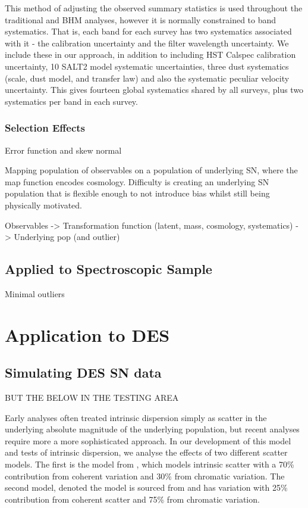 \documentclass[a4paper,fleqn,usenatbib]{mnras}
\newcommand{\green}{\color{green}}
\newcommand{\gten}{\citetalias{Guy2010}}
\newcommand{\celeven}{\citetalias{Chotard2011}}
\begin{document}
This method of adjusting the observed summary statistics is used throughout the traditional and BHM analyses, however it is normally constrained to band systematics. That is, each band for each survey has two systematics associated with it - the calibration uncertainty and the filter wavelength uncertainty. We include these in our approach, in addition to including HST Calspec calibration uncertainty, 10 SALT2 model systematic uncertainties, three dust systematics (scale, dust model, and transfer law) and also the systematic peculiar velocity uncertainty. This gives fourteen global systematics shared by all surveys, plus two systematics per band in each survey.

\subsubsection{Selection Effects}

Error function and skew normal




\vspace{20mm}
Mapping population of observables on a population of underlying SN, where the map function encodes
cosmology. Difficulty is creating an underlying SN population that is flexible enough to not introduce bias whilst still being physically motivated. 


Observables -> Transformation function (latent, mass, cosmology, systematics) -> Underlying pop (and outlier)

\subsection{Applied to Spectroscopic Sample}

Minimal outliers

\section{Application to DES}
\label{sec:des}

\subsection{Simulating DES SN data}
\label{sec:simdes}
{\green BUT THE BELOW IN THE TESTING AREA}

Early analyses often treated intrinsic dispersion simply as scatter in the underlying absolute magnitude of the underlying population, but recent analyses require more a more sophisticated approach. In our development of this model and tests of intrinsic dispersion, we analyse the effects of two different scatter models. The first is the model from \citet[][hereafter denoted the {\gten} scatter model]{Guy2010}, which models intrinsic scatter with a 70\% contribution from coherent variation and 30\% from chromatic variation. The second model, denoted the {\celeven} model is sourced from \citet{Chotard2011} and has variation with 25\% contribution from coherent scatter and 75\% from chromatic variation.
\end{document}
